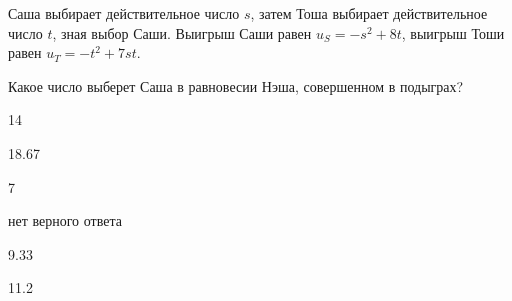 
\begin{question}
Саша выбирает действительное число \(s\), затем Тоша выбирает
действительное число \(t\), зная выбор Саши. Выигрыш Саши равен
\(u_S = -s^2 + 8t\), выигрыш Тоши равен \(u_T = -t^2 + 7 st\).

Какое число выберет Саша в равновесии Нэша, совершенном в подыграх?
\begin{answerlist}
  \item 14
  \item 18.67
  \item 7
  \item нет верного ответа
  \item 9.33
  \item 11.2
\end{answerlist}
\end{question}


